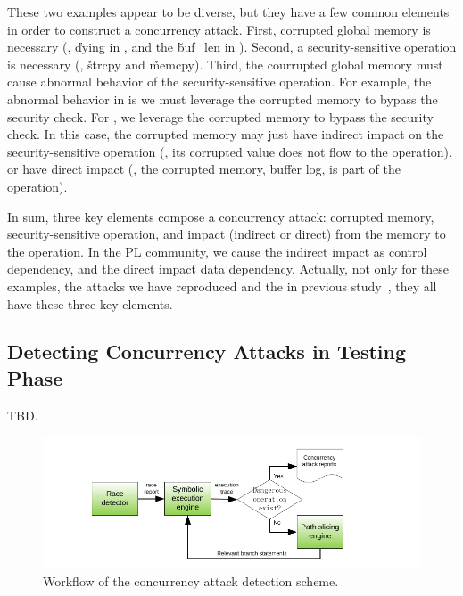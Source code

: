These two examples appear to be diverse, but they have a few common elements in 
order to construct a concurrency attack. First, corrupted global memory is 
necessary (\eg, \v{dying} in \libsafe, and the \v{buf\_len} in \apache). 
Second, a security-sensitive operation is necessary (\eg, \v{strcpy} and 
\v{memcpy}). Third, the courrupted global memory must cause abnormal behavior of 
the security-sensitive operation. For example, the abnormal behavior in \libsafe 
is we must leverage the corrupted memory to bypass the security check. For 
\apache, we leverage the corrupted memory to bypass the security check. In this 
case, the corrupted memory may just have indirect impact on the 
security-sensitive operation (\ie, its corrupted value does not flow to the 
operation), or have direct impact (\ie, the corrupted memory, buffer log, is 
part of the operation).

In sum, three key elements compose a concurrency attack: corrupted memory, 
security-sensitive operation, and impact (indirect or direct) from the memory 
to the operation. In the PL community, we cause the indirect impact as control 
dependency, and the direct impact data dependency. Actually, not only for these 
examples, the \nattacks attacks we have reproduced and the \noldattacks in 
previous study~\cite{con:hotpar12}, they all have these three key elements.







\subsection{Detecting Concurrency Attacks in Testing Phase}\label{sec:detect}

TBD.

\begin{figure}[t]
\centering
\includegraphics[width=0.5\columnwidth]{figures/detection}
\vspace{-.05in}
\caption{{Workflow of the concurrency attack detection scheme.}} 
\label{fig:detection}
\vspace{-.05in}
\end{figure}


